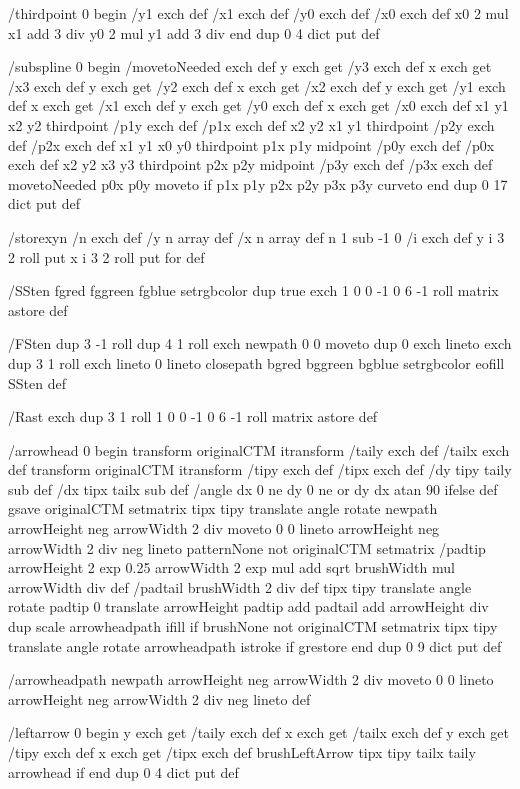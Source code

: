 /thirdpoint {
0 begin
/y1 exch def
/x1 exch def
/y0 exch def
/x0 exch def
x0 2 mul x1 add 3 div
y0 2 mul y1 add 3 div
end
} dup 0 4 dict put def

/subspline {
0 begin
/movetoNeeded exch def
y exch get /y3 exch def
x exch get /x3 exch def
y exch get /y2 exch def
x exch get /x2 exch def
y exch get /y1 exch def
x exch get /x1 exch def
y exch get /y0 exch def
x exch get /x0 exch def
x1 y1 x2 y2 thirdpoint
/p1y exch def
/p1x exch def
x2 y2 x1 y1 thirdpoint
/p2y exch def
/p2x exch def
x1 y1 x0 y0 thirdpoint
p1x p1y midpoint
/p0y exch def
/p0x exch def
x2 y2 x3 y3 thirdpoint
p2x p2y midpoint
/p3y exch def
/p3x exch def
movetoNeeded { p0x p0y moveto } if
p1x p1y p2x p2y p3x p3y curveto
end
} dup 0 17 dict put def

/storexyn {
/n exch def
/y n array def
/x n array def
n 1 sub -1 0 {
/i exch def
y i 3 2 roll put
x i 3 2 roll put
} for
} def

/SSten {
fgred fggreen fgblue setrgbcolor
dup true exch 1 0 0 -1 0 6 -1 roll matrix astore
} def

/FSten {
dup 3 -1 roll dup 4 1 roll exch
newpath
0 0 moveto
dup 0 exch lineto
exch dup 3 1 roll exch lineto
0 lineto
closepath
bgred bggreen bgblue setrgbcolor
eofill
SSten
} def

/Rast {
exch dup 3 1 roll 1 0 0 -1 0 6 -1 roll matrix astore
} def


/arrowhead {
0 begin
transform originalCTM itransform
/taily exch def
/tailx exch def
transform originalCTM itransform
/tipy exch def
/tipx exch def
/dy tipy taily sub def
/dx tipx tailx sub def
/angle dx 0 ne dy 0 ne or { dy dx atan } { 90 } ifelse def
gsave
originalCTM setmatrix
tipx tipy translate
angle rotate
newpath
arrowHeight neg arrowWidth 2 div moveto
0 0 lineto
arrowHeight neg arrowWidth 2 div neg lineto
patternNone not {
originalCTM setmatrix
/padtip arrowHeight 2 exp 0.25 arrowWidth 2 exp mul add sqrt brushWidth mul
arrowWidth div def
/padtail brushWidth 2 div def
tipx tipy translate
angle rotate
padtip 0 translate
arrowHeight padtip add padtail add arrowHeight div dup scale
arrowheadpath
ifill
} if
brushNone not {
originalCTM setmatrix
tipx tipy translate
angle rotate
arrowheadpath
istroke
} if
grestore
end
} dup 0 9 dict put def

/arrowheadpath {
newpath
arrowHeight neg arrowWidth 2 div moveto
0 0 lineto
arrowHeight neg arrowWidth 2 div neg lineto
} def

/leftarrow {
0 begin
y exch get /taily exch def
x exch get /tailx exch def
y exch get /tipy exch def
x exch get /tipx exch def
brushLeftArrow { tipx tipy tailx taily arrowhead } if
end
} dup 0 4 dict put def

